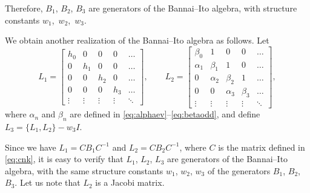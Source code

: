 \documentclass[pdftex]{sigma}
\numberwithin{equation}{section}
\begin{document}
	Therefore, $B_1$, $B_2$, $B_3$ are generators of the Bannai--Ito algebra, with structure constants $w_1$,~$w_2$,~$w_3$.

We obtain another realization of the Bannai--Ito algebra as follows. Let
\begin{equation*}%
 L_1= \begin{bmatrix} h_0 & 0 & 0 & 0 & \dots \\
   0  & h_1 & 0 & 0 & \dots \\
     0 & 0  & h_2  & 0 & \dots \\
       0 & 0 & 0  & h_3 & \dots \\
   \vdots  & \vdots  & \vdots  & \vdots  &  \ddots  \end{bmatrix}, \qquad
 L_2 = \begin{bmatrix} \beta_0 & 1 & 0 & 0 & \dots \\
       \alpha_1 & \beta_1 & 1 & 0 & \dots \\
      0 & \alpha_2 & \beta_2  & 1 & \dots \\
      0 & 0 & \alpha_3 & \beta_3 & \dots \\
 \vdots  & \vdots  & \vdots  & \vdots  &  \ddots  \end{bmatrix}, \end{equation*}
	where $\alpha_n$ and $\beta_n$ are defined in \eqref{eq:alphaev}--\eqref{eq:betaodd},
	and define $L_3=\{L_1,L_2\} - w_3 I$.

	Since we have $L_1=C B_1 C^{-1}$ and $L_2= C B_2 C^{-1}$, where $C$ is the matrix defined in \eqref{eq:cnk},
 it is easy to verify that $L_1$, $L_2$, $L_3$ are generators of the Bannai--Ito algebra, with the same structure constants $w_1$, $w_2$, $w_3$ of the generators $B_1$, $B_2$, $B_3$. Let us note that $L_2$ is a Jacobi matrix.
\end{document}
